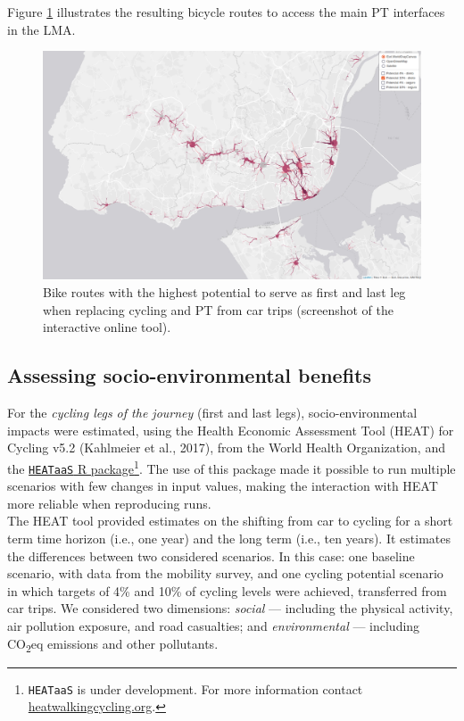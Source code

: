 \documentclass[review, doubleblind, 3p,
authoryear]{elsarticle} %
\begin{document}
Figure \ref{fig:map2} illustrates the resulting bicycle routes to access
the main PT interfaces in the LMA.

\begin{figure}

{\centering \includegraphics[width=0.8\linewidth,]{img/map2} 

}

\caption{Bike routes with the highest potential to serve as first and last leg when replacing cycling and PT from car trips (screenshot of the interactive online tool).}\label{fig:map2}
\end{figure}

\hypertarget{assessing-socio-environmental-benefits}{%
\subsection{Assessing socio-environmental
benefits}\label{assessing-socio-environmental-benefits}}

For the \emph{cycling legs of the journey} (first and last legs),
socio-environmental impacts were estimated, using the Health Economic
Assessment Tool (HEAT) for Cycling v5.2 (Kahlmeier et al., 2017), from
the World Health Organization, and the
\href{https://github.com/HEAT-WHO/HEAT_heatr_api}{\texttt{HEATaaS} R
package}\footnote{\texttt{HEATaaS} is under development. For more
  information contact
  \href{https://heatwalkingcycling.org}{heatwalkingcycling.org}.}. The
use of this package made it possible to run multiple scenarios with few
changes in input values, making the interaction with HEAT more reliable
when reproducing runs.\\
The HEAT tool provided estimates on the shifting from car to cycling for
a short term time horizon (i.e., one year) and the long term (i.e., ten
years). It estimates the differences between two considered scenarios.
In this case: one baseline scenario, with data from the mobility survey,
and one cycling potential scenario in which targets of 4\% and 10\% of
cycling levels were achieved, transferred from car trips. We considered
two dimensions: \emph{social} --- including the physical activity, air
pollution exposure, and road casualties; and \emph{environmental} ---
including CO\textsubscript{2}eq emissions and other pollutants.
\end{document}
